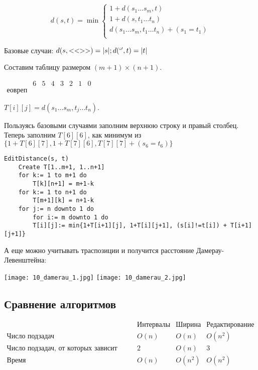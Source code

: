 \[
    d(s, t) = \min\begin{cases}
        1+d(s_1\ldots s_m, t) \\
        1+d(s, t_1\ldots t_n) \\
        d(s_1\ldots s_m, t_1\ldots t_n) + (s_1=t_1) \\
    \end{cases}
\]

Базовые случаи: $d(s, <<>>) = |s|; d(`', t) = |t|$

Составим таблицу размером $(m+1)\times (n+1)$.

$\begin{array}{c|ccccccc}
 &6&5&4&3&2&1&0\\
 \text{е}
 \text{о}
 \text{в}
 \text{р}
 \text{е}
 \text{п}
\end{array}$

$T[i][j] = d(s_1\ldots s_m, t_j\ldots t_n)$.

Пользуясь базовыми случаями заполним верхнюю строку и правый столбец. Теперь заполним $T[6][6]$, как минимум из $\{1+T[6][7], 1+T[7][6], T[7][7]+(s_6=t_6)\}$

\begin{lstlisting}
EditDistance(s, t)
    Create T[1..m+1, 1..n+1]
    for k:= 1 to m+1 do
        T[k][n+1] = m+1-k
    for k:= 1 to n+1 do
        T[m+1][k] = n+1-k
    for j:= n downto 1 do
        for i:= m downto 1 do
        T[i][j]:= min{1+T[i+1][j], 1+T[i][j+1], (s[i]!=t[i]) + T[i+1][j+1]}
\end{lstlisting}

А еще можно учитывать траспозиции и получится расстояние Дамерау-Левенштейна:

\texttt{[image: 10\_damerau\_1.jpg]}
\texttt{[image: 10\_damerau\_2.jpg]}

\subsection{Сравнение алгоритмов}

\[
    \begin{array}{c|ccc}
        &\text{Интервалы}&\text{Ширина}&\text{Редактирование}\\
        \text{Число подзадач}&O(n)&O(n)&O(n^2)\\
        \text{Число подзадач, от которых зависит задача}&2&O(n)&3\\
        \text{Время}&O(n)&O(n^2)&O(n^2)\\
    \end{array}
\]


